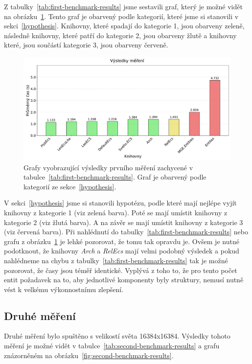 Z tabulky~\ref{tab:first-benchmark-results} jsme sestavili graf, který je možné vidět na obrázku~\ref{fig:first-benchmark-results}. Tento graf je obarvený podle kategorií, které jsme si stanovili v sekci~\ref{hypothesis}. Knihovny, které spadají do kategorie 1, jsou obarveny zeleně, následně knihovny, které patří do kategorie 2, jsou obarveny žlutě a knihovny které, jsou součástí kategorie 3, jsou obarveny červeně.

\begin{figure}[!htb]
    \centering
    \includegraphics[width=1.0\linewidth]{plots/first_benchmark_results.pdf}
    \caption{Grafy vyobrazující výsledky prvního měření zachycené v tabulce~\ref{tab:first-benchmark-results}. Graf je obarvený podle kategorií ze sekce~\ref{hypothesis}.}
    \label{fig:first-benchmark-results}
\end{figure}

V sekci~\ref{hypothesis} jsme si stanovili hypotézu, podle které mají nejlépe vyjít knihovny z kategorie 1 (viz zelená barva). Poté se mají umístit knihovny z kategorie 2 (viz žlutá barva). A na závěr se mají umístit knihovny z kategorie 3 (viz červená barva). Při nahlédnutí do tabulky~\ref{tab:first-benchmark-results} nebo grafu z obrázku~\ref{fig:first-benchmark-results} je lehké pozorovat, že tomu tak opravdu je. Ovšem je nutné podotknout, že knihovny \textit{Arch} a \textit{RelEcs} mají velmi podobný výsledek a pokud nahlédneme na chybu z tabulky~\ref{tab:first-benchmark-results} tak je možné pozorovat, že časy jsou téměř identické. Vyplývá z toho to, že pro tento počet entit požadavek na to, aby jednotlivé komponenty byly struktury, nemusí nutně vést k velkému výkonnostnímu zlepšení.

\subsection{Druhé měření}
Druhé měření bylo spuštěno s velikostí světa 16384x16384. Výsledky tohoto měření je možné vidět v tabulce~\ref{tab:second-benchmark-results} a grafu znázorněném na obrázku~\ref{fig:second-benchmark-results}.

